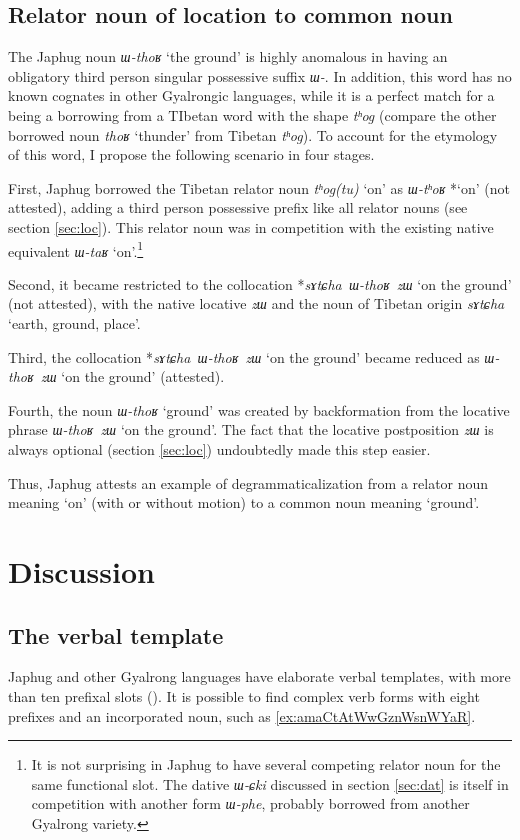\documentclass[oneside,a4paper,11pt]{article}
\newcommand{\ipa}[1]{\mbox{\phon\textit{#1}}} %
\begin{document}
 \subsection{Relator noun of location to common noun}

The Japhug noun \ipa{ɯ-thoʁ} `the ground' is highly anomalous in having an obligatory third person singular possessive suffix \ipa{ɯ-}. In addition, this word has no known cognates in other Gyalrongic languages, while it is a perfect match for a being a borrowing from a TIbetan word with the shape \ipa{tʰog} (compare the other borrowed noun \ipa{thoʁ} `thunder' from Tibetan \ipa{tʰog}). To account for the etymology of this word, I propose the following scenario in four stages.

First, Japhug borrowed the Tibetan relator noun  \ipa{tʰog(tu)} `on' as \ipa{ɯ-tʰoʁ} *`on' (not attested), adding a third person possessive prefix like all relator nouns (see section \ref{sec:loc}). This relator noun was in competition with the existing native equivalent \ipa{ɯ-taʁ} `on'.\footnote{It is not surprising in Japhug to have several competing relator noun for the same functional slot. The dative \ipa{ɯ-ɕki} discussed in section \ref{sec:dat} is itself in competition with another form \ipa{ɯ-phe}, probably borrowed from another Gyalrong variety.  }
  
  Second, it  became restricted to the collocation *\ipa{sɤtɕha ɯ-thoʁ zɯ} `on the ground' (not attested), with the native locative \ipa{zɯ} and the  noun of Tibetan origin \ipa{sɤtɕha} `earth, ground, place'.
  
    Third, the collocation *\ipa{sɤtɕha ɯ-thoʁ zɯ} `on the ground' became reduced as \ipa{ɯ-thoʁ zɯ} `on the ground' (attested).
 
 Fourth, the noun \ipa{ɯ-thoʁ} `ground' was created by backformation from the locative phrase \ipa{ɯ-thoʁ zɯ} `on the ground'. The fact that the locative postposition \ipa{zɯ} is always optional (section \ref{sec:loc}) undoubtedly made this step easier.
 
 Thus, Japhug attests an example of degrammaticalization from a relator noun meaning `on' (with or without motion) to a common noun meaning `ground'.
 
    \section{Discussion} 



\subsection{The verbal template} \label{sec:template}
 Japhug and other Gyalrong languages have elaborate verbal templates, with more than ten prefixal slots (\citealt{jacques13harmonization}). It is possible to find complex verb forms with eight prefixes and an incorporated noun, such as \ref{ex:amaCtAtWwGznWsnWYaR}.
 
\end{document}
